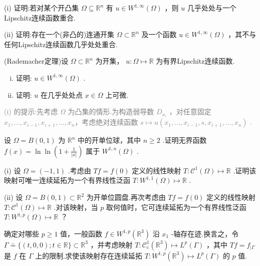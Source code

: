 \begin{rbhw}
(i) 证明:若对某个开凸集 $\Omega  \subseteq  {\mathbb{R}}^{n}$ 有 $u \in  {W}^{1,\infty }\left( \Omega \right)$ ，则 $u$ 几乎处处与一个Lipschitz连续函数重合.

(ii) 证明:存在一个(非凸的)连通开集 $\Omega  \subset  {\mathbb{R}}^{n}$ 及一个函数 $u \in  {W}^{1,\infty }\left( \Omega \right)$ ，其不与任何Lipschitz连续函数几乎处处重合.
\end{rbhw}

\begin{rbhw}
(Rademacher定理)设 $\Omega  \subset  {\mathbb{R}}^{n}$ 为开集， $u : \Omega  \mapsto  \mathbb{R}$ 为有界Lipschitz连续函数.
\begin{enumerate}[(i)]
    \item 证明: $u \in  {W}^{1,\infty }\left( \Omega \right)$ .
    \item 证明: $u$ 在几乎处处点 $x \in  \Omega$ 上可微.
\end{enumerate}
\textcolor{gray}{(i) 的提示:先考虑 $\Omega$ 为凸集的情形.为构造弱导数 ${D}_{{x}_{i}}$ ，对任意固定 ${x}_{1},\ldots ,{x}_{i - 1},{x}_{i + 1},\allowbreak \ldots ,{x}_{n}$，考虑绝对连续函数 $s \mapsto  u( {x}_{1},\ldots ,{x}_{i - 1},s,{x}_{i + 1},\ldots ,{x}_{n} )$ .}
\end{rbhw}

\begin{rbhw}
设 $\Omega  = B\left( {0,1}\right)$ 为 ${\mathbb{R}}^{n}$ 中的开单位球，其中 $n \geq  2$ .证明无界函数 $f\left( x\right)  = \ln \ln \left( {1 + \frac{1}{\left| x\right| }}\right)$ 属于 ${W}^{1,n}\left( \Omega \right)$ .
\end{rbhw}

\begin{rbhw}
(i) 设 $\Omega  = (-1,1)$ .考虑由 ${Tf} = f\left( 0\right)$ 定义的线性映射 $T : {\mathcal{C}}^{1}\left( \Omega \right)  \mapsto  \mathbb{R}$ .证明该映射可唯一连续延拓为一个有界线性泛函 $T : {W}^{1,1}\left( \Omega \right)  \mapsto  \mathbb{R}$ .\par
\indent (ii) 设 $\Omega  = B\left( {0,1}\right)  \subset  {\mathbb{R}}^{2}$ 为开单位圆盘.再次考虑由 ${Tf} = f\left( 0\right)$ 定义的线性映射 $T : {\mathcal{C}}^{1}\left( \Omega \right)  \mapsto  \mathbb{R}$ .对该映射，当 $p$ 取何值时，它可连续延拓为一个有界线性泛函 $T : {W}^{1,p}\left( \Omega \right)  \mapsto  \mathbb{R}$ ？
\end{rbhw}

\begin{rbhw}
确定对哪些 $p \geq  1$ 值，一般函数 $f \in  {W}^{1,p}\left( {\mathbb{R}}^{3}\right)$ 沿 ${x}_{1}$ -轴存在迹.换言之，令 $\Gamma  \doteq  \{ \left( {t,0,0}\right) ;t \in  \mathbb{R}\}  \subset  {\mathbb{R}}^{3}$ ，并考虑映射 $T : {\mathcal{C}}_{\mathrm{c}}^{1}\left( {\mathbb{R}}^{3}\right)  \mapsto  {L}^{p}\left( \Gamma \right)$ ，其中 ${Tf} = {f}_{\mid \Gamma }$ 是 $f$ 在 $\Gamma$ 上的限制.求使该映射存在连续延拓 $T : {W}^{1,p}\left( {\mathbb{R}}^{3}\right)  \mapsto  {L}^{p}\left( \Gamma \right)$ 的 $p$ 值.
\end{rbhw}

